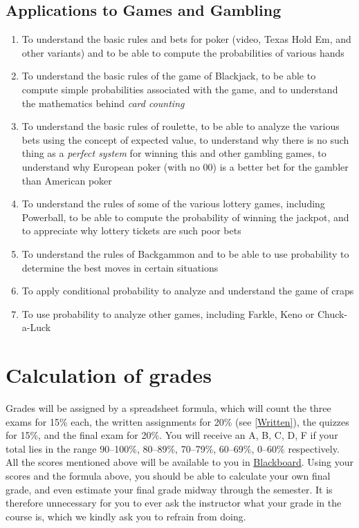 \documentclass[11pt]{article}
\begin{document}
\subsection{Applications to Games and Gambling}
\begin{enumerate}
\item To understand the basic rules and bets for poker
(video, Texas Hold Em, and other variants)
and to be able to compute the probabilities of various hands
\item To understand the basic rules of the game of Blackjack,
to be able to compute simple probabilities associated with the game,
and to understand the mathematics behind {\em card counting}
\item To understand the basic rules of roulette,
to be able to analyze the various bets using the concept of expected value,
to understand why there is no such thing as a {\em perfect system}
for winning this and other gambling games,
to understand why European poker (with no 00)
is a better bet for the gambler than American poker
\item To understand the rules of some of the various lottery games,
including Powerball,
to be able to compute the probability of winning the jackpot,
and to appreciate why lottery tickets are such poor bets
\item To understand the rules of Backgammon and to be able to use
probability to determine the best moves in certain situations
\item To apply conditional probability to analyze
and understand the game of craps
\item To use probability to analyze other games,
including Farkle, Keno or Chuck-a-Luck
\end{enumerate}

\section{Calculation of grades}\label{Assessment}
Grades will be assigned by a spreadsheet formula, which will count
the three exams for 15\% each,
the written assignments for 20\% (see \autoref{Written}),
the quizzes for 15\%, and the final exam for 20\%.
You will receive an A, B, C, D, F if your total lies in the range
90--100\%, 80--89\%, 70--79\%, 60--69\%, 0--60\% respectively.
All the scores mentioned above will be available to you in
\href{https://bb.its.iastate.edu}{Blackboard}. Using your scores
and the formula above, you should be able to calculate your own final grade,
and even estimate your final grade midway through the semester.
It is therefore unnecessary for you to ever ask the instructor
what your grade in the course is, which we kindly ask you to refrain from
doing.
\end{document}
